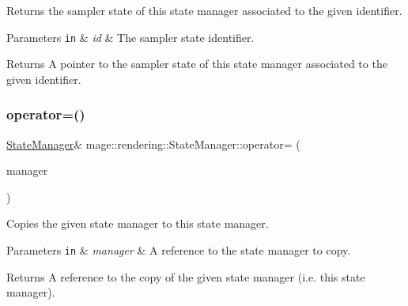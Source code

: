 Returns the sampler state of this state manager associated to the given identifier.


\begin{DoxyParams}[1]{Parameters}
\mbox{\tt in}  & {\em id} & The sampler state identifier. \\
\hline
\end{DoxyParams}
\begin{DoxyReturn}{Returns}
A pointer to the sampler state of this state manager associated to the given identifier. 
\end{DoxyReturn}
\mbox{\label{classmage_1_1rendering_1_1_state_manager_a07e3b6663a4d3c814cddbd920bd4ced4}} 
\subsubsection{\texorpdfstring{operator=()}{operator=()}\hspace{0.1cm}{\footnotesize\ttfamily [1/2]}}
{\footnotesize\ttfamily \mbox{\hyperlink{classmage_1_1rendering_1_1_state_manager}{State\+Manager}}\& mage\+::rendering\+::\+State\+Manager\+::operator= (\begin{DoxyParamCaption}\item[{const \mbox{\hyperlink{classmage_1_1rendering_1_1_state_manager}{State\+Manager}} \&}]{manager }\end{DoxyParamCaption})\hspace{0.3cm}{\ttfamily [delete]}}

Copies the given state manager to this state manager.


\begin{DoxyParams}[1]{Parameters}
\mbox{\tt in}  & {\em manager} & A reference to the state manager to copy. \\
\hline
\end{DoxyParams}
\begin{DoxyReturn}{Returns}
A reference to the copy of the given state manager (i.\+e. this state manager). 
\end{DoxyReturn}
\mbox{\label{classmage_1_1rendering_1_1_state_manager_a75eedc5c3a5345de8b6a1c4dea7491a1}} 
